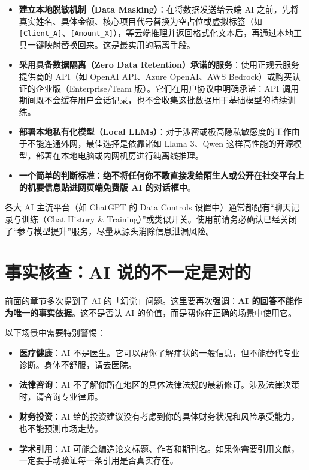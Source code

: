 \begin{itemize}
  \item \textbf{建立本地脱敏机制（Data Masking）}：在将数据发送给云端 AI 之前，先将真实姓名、具体金额、核心项目代号替换为空占位或虚拟标签（如 \verb|[Client_A]|、\verb|[Amount_X]|），等云端推理并返回格式化文本后，再通过本地工具一键映射替换回来。这是最实用的隔离手段。
  \item \textbf{采用具备数据隔离（Zero Data Retention）承诺的服务}：使用正规云服务提供商的 API（如 OpenAI API、Azure OpenAI、AWS Bedrock）或购买认证的企业版（Enterprise/Team 版）。它们在用户协议中明确承诺：API 调用期间既不会缓存用户会话记录，也不会收集这批数据用于基础模型的持续训练。
  \item \textbf{部署本地私有化模型（Local LLMs）}：对于涉密或极高隐私敏感度的工作由于不能连通外网，最佳选择是依靠诸如 Llama 3、Qwen 这样高性能的开源模型，部署在本地电脑或内网机房进行纯离线推理。
  \item \textbf{一个简单的判断标准}：\textbf{绝不将任何你不敢直接发给陌生人或公开在社交平台上的机要信息贴进网页端免费版 AI 的对话框中}。
\end{itemize}

\begin{tipbox}
各大 AI 主流平台（如 ChatGPT 的 Data Controls 设置中）通常都配有“聊天记录与训练（Chat History \& Training）”或类似开关。使用前请务必确认已经关闭了“参与模型提升”服务，尽量从源头消除信息泄漏风险。
\end{tipbox}

\section{事实核查：AI 说的不一定是对的}

前面的章节多次提到了 AI 的「幻觉」问题。这里要再次强调：\textbf{AI 的回答不能作为唯一的事实依据}。这不是否认 AI 的价值，而是帮你在正确的场景中使用它。

以下场景中需要特别警惕：

\begin{itemize}
  \item \textbf{医疗健康}：AI 不是医生。它可以帮你了解症状的一般信息，但不能替代专业诊断。身体不舒服，请去医院。
  \item \textbf{法律咨询}：AI 不了解你所在地区的具体法律法规的最新修订。涉及法律决策时，请咨询专业律师。
  \item \textbf{财务投资}：AI 给的投资建议没有考虑到你的具体财务状况和风险承受能力，也不能预测市场走势。
  \item \textbf{学术引用}：AI 可能会编造论文标题、作者和期刊名。如果你需要引用文献，一定要手动验证每一条引用是否真实存在。
\end{itemize}

